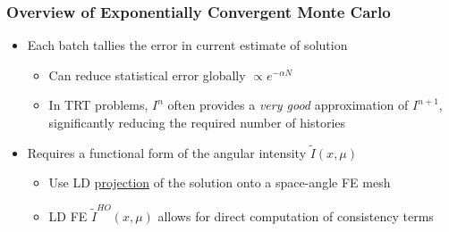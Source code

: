 \documentclass[xcolor=dvipsnames,hyperref={pdfpagelabels=false},unknownkeysallowed]{beamer}
\renewcommand{\u}[1]{\underline{#1}}
\newcommand{\colb}[1]{{\color{blue} #1}}
\newcommand{\colr}[1]{{\color{red} #1}}
\newlength{\wideitemsep}
\let\olditem\item
\renewcommand{\item}{\setlength{\itemsep}{\wideitemsep}\olditem}
\begin{document}
\begin{frame}
    \frametitle{Overview of Exponentially Convergent Monte Carlo}
    \begin{itemize}
        \item Each batch tallies the \colb{error} in current estimate of solution
            \begin{itemize}
    \item Can reduce statistical error \colb{globally} $\propto e^{-\alpha N}$
    \item In TRT problems, $I^{n}$ often provides a \emph{very good} approximation of
        $I^{n+1}$, significantly reducing the required number of histories
\end{itemize}
     \end{itemize}
    \begin{minipage}{0.6\linewidth}
        \vspace{-2.0in}
        \pause
     \begin{itemize}
     \item Requires a \colr{functional form} of the angular intensity $\tilde I(x,\mu)$
            \begin{itemize}
                \item Use LD \u{\colb{projection}} of the solution onto a space-angle FE
                    mesh
        \item LD FE $\tilde  I^{HO}(x,\mu)$ allows for direct computation of
            consistency terms
    \end{itemize}
    \end{itemize}
    \end{minipage}
    \begin{minipage}[t]{0.3\linewidth}
        \centering
    \end{minipage}%
\end{frame}
\end{document}

